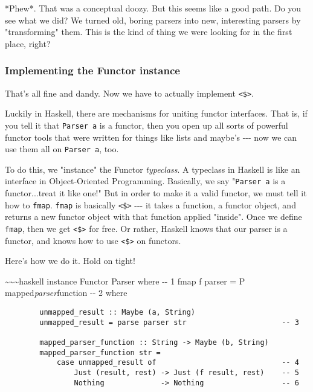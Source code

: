 \documentclass[]{article}
\begin{document}
*Phew*. That was a conceptual doozy. But this seems like a good path. Do you see
what we did? We turned old, boring parsers into new, interesting parsers by
"transforming" them. This is the kind of thing we were looking for in the first
place, right?

\subsubsection{Implementing the Functor instance}

That's all fine and dandy. Now we have to actually implement
\texttt{\textless{}\$\textgreater{}}.

Luckily in Haskell, there are mechanisms for uniting functor interfaces. That
is, if you tell it that \texttt{Parser\ a} is a functor, then you open up all
sorts of powerful functor tools that were written for things like lists and
maybe's -\/-\/- now we can use them all on \texttt{Parser\ a}, too.

To do this, we "instance" the Functor \emph{typeclass}. A typeclass in Haskell
is like an interface in Object-Oriented Programming. Basically, we say
"\texttt{Parser\ a} is a functor...treat it like one!" But in order to make it a
valid functor, we must tell it how to \texttt{fmap}. \texttt{fmap} is basically
\texttt{\textless{}\$\textgreater{}} -\/-\/- it takes a function, a functor
object, and returns a new functor object with that function applied "inside".
Once we define \texttt{fmap}, then we get \texttt{\textless{}\$\textgreater{}}
for free. Or rather, Haskell knows that our parser is a functor, and knows how
to use \texttt{\textless{}\$\textgreater{}} on functors.

Here's how we do it. Hold on tight!

\textasciitilde{}\textasciitilde{}\textasciitilde{}haskell instance Functor
Parser where -\/- 1 fmap f parser = P mapped\emph{parser}function -\/- 2 where

\begin{verbatim}
        unmapped_result :: Maybe (a, String)
        unmapped_result = parse parser str                      -- 3

        mapped_parser_function :: String -> Maybe (b, String)
        mapped_parser_function str =
            case unmapped_result of                             -- 4
                Just (result, rest) -> Just (f result, rest)    -- 5
                Nothing             -> Nothing                  -- 6
\end{verbatim}
\end{document}
